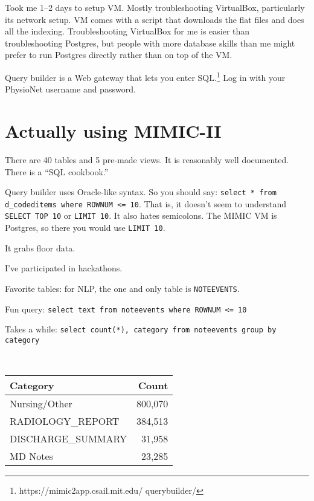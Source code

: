 \documentclass{tufte-handout}
\begin{document}
Took me 1--2 days to setup VM. Mostly troubleshooting VirtualBox,
particularly its network setup. VM comes with a script that downloads
the flat files and does all the indexing. Troubleshooting VirtualBox
for me is easier than troubleshooting Postgres, but people with more
database skills than me might prefer to run Postgres directly rather
than on top of the VM.

Query builder is a Web gateway that lets you enter
SQL.\footnote{https://mimic2app.csail.mit.edu/ querybuilder/} Log in
with your PhysioNet username and password.

\section{Actually using MIMIC-II}

There are 40 tables and 5 pre-made views. It is reasonably well
documented. There is a ``SQL cookbook.''

Query builder uses Oracle-like syntax. So you should say: \texttt{select *
from d\_codeditems where ROWNUM <= 10}. That is, it doesn't seem to
understand \texttt{SELECT TOP 10} or \texttt{LIMIT 10}. It also hates
semicolons. The MIMIC VM is Postgres, so there you would use \texttt{LIMIT
10}.

It grabs floor data.

I've participated in hackathons.

Favorite tables: for NLP, the one and only table is \texttt{NOTEEVENTS}.

Fun query: \texttt{select text from noteevents where ROWNUM <= 10}

Takes a while: \texttt{select count(*), category from noteevents group by
category}

~\\

\begin{tabular}{l r}
\hline
Category & Count \\
\hline
Nursing/Other & 800,070 \\
RADIOLOGY\_REPORT & 384,513 \\
DISCHARGE\_SUMMARY & 31,958 \\
MD Notes & 23,285 \\
\hline
\end{tabular}
\end{document}
